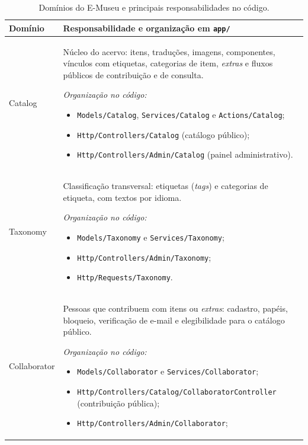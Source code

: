 \newcommand{\camadas}[1]{%
    \par\vspace{0.35em}%
    \noindent\textit{Organização no código:}%
    \begin{itemize}[nosep,leftmargin=1.25em,topsep=2pt,partopsep=0pt]#1\end{itemize}%
}

\begin{table}[H]
    \centering
    \caption{Domínios do E-Museu e principais responsabilidades no código.}
    \label{tab:dominios-emuseu}
    \footnotesize
    \setlength{\tabcolsep}{6pt}
    \renewcommand{\arraystretch}{1.25}
    \begin{tabularx}{\textwidth}{@{}
        >{\raggedright\arraybackslash}p{}
        >{\raggedright\arraybackslash}X
    @{}}
        \toprule
        Domínio & Responsabilidade e organização em \texttt{app/} \\
        \midrule
        Catalog &
        Núcleo do acervo: itens, traduções, imagens, componentes, vínculos com etiquetas, categorias de item, \textit{extras} e fluxos públicos de contribuição e de consulta.
        \camadas{%
            \item \texttt{Models/Catalog}, \texttt{Services/Catalog} e \texttt{Actions/Catalog};
            \item \texttt{Http/Controllers/Catalog} (catálogo público);
            \item \texttt{Http/Controllers/Admin/Catalog} (painel administrativo).
        } \\
        Taxonomy &
        Classificação transversal: etiquetas (\textit{tags}) e categorias de etiqueta, com textos por idioma.
        \camadas{%
            \item \texttt{Models/Taxonomy} e \texttt{Services/Taxonomy};
            \item \texttt{Http/Controllers/Admin/Taxonomy};
            \item \texttt{Http/Requests/Taxonomy}.
        } \\
        Collaborator &
        Pessoas que contribuem com itens ou \textit{extras}: cadastro, papéis, bloqueio, verificação de e-mail e elegibilidade para o catálogo público.
        \camadas{%
            \item \texttt{Models/Collaborator} e \texttt{Services/Collaborator};
            \item \texttt{Http/Controllers/Catalog/CollaboratorController} (contribuição pública);
            \item \texttt{Http/Controllers/Admin/Collaborator};
}
\end{tabularx}
\end{table}
